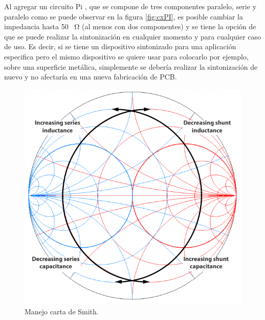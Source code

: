 Al agregar un circuito Pi , que se compone de tres componentes paralelo, serie y paralelo como se puede observar en la figura \ref{fig:cxPI}, es posible cambiar la impedancia hasta 50 \SI{}{\ohm} (al menos con dos componentes) y se tiene la opción de que se puede realizar la sintonización en cualquier momento y para cualquier caso de uso. Es decir, si se tiene un dispositivo sintonizado para una aplicación especifica pero el mismo dispositivo se quiere usar para colocarlo por ejemplo, sobre una superficie metálica, simplemente se debería realizar la sintonización de nuevo y no afectaría en una nueva fabricación de PCB.
\begin{figure}[H]
	\centering
	\includegraphics[scale=.45]{./Figures/ManejocartaSmith.PNG}
	\caption{Manejo carta de Smith\citep{NordicSemiconductor2012}.}
	\label{fig:ManejocartaSmith}
\end{figure}


